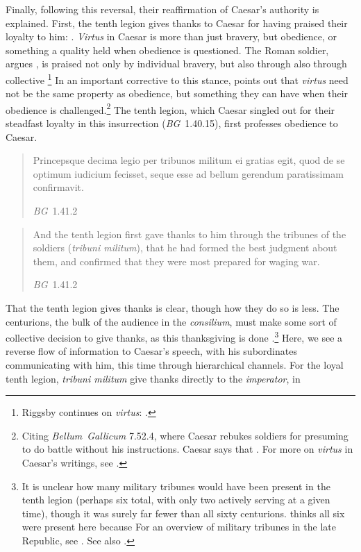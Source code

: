 \documentclass[12pt,letterpaper,oneside,final]{memoir}
\begin{document}
Finally, following this reversal, their reaffirmation of Caesar's authority is explained. First, the tenth legion gives thanks to Caesar for having praised their loyalty to him: . \emph{Virtus} in Caesar is more than just bravery, but obedience, or something a quality held when obedience is questioned. The Roman soldier, argues \textcite[89]{riggsby2006}, is praised not only by individual bravery, but also through also through collective \footnote{Riggsby continues on \emph{virtus}: .} In an important corrective to this stance, \textcite[303--304]{mcdonnell2006} points out that \emph{virtus} need not be the same property as obedience, but something they can have when their obedience is challenged.\footnote{Citing \emph{Bellum~Gallicum} 7.52.4, where Caesar rebukes soldiers for presuming to do battle without his instructions. Caesar says that . For more on \emph{virtus} in Caesar's writings, see \textcite[300--319]{mcdonnell2006}.} The tenth legion, which Caesar singled out for their steadfast loyalty in this insurrection (\emph{BG}~1.40.15), first professes obedience to Caesar. \blockquote[\emph{BG}~1.41.2]{\textlatin{Princepsque decima legio per tribunos militum ei gratias egit, quod de se optimum iudicium fecisset, seque esse ad bellum gerendum paratissimam confirmavit.}} \blockquote[\emph{BG}~1.41.2]{And the tenth legion first gave thanks to him through the tribunes of the soldiers (\emph{tribuni militum}), that he had formed the best judgment about them, and confirmed that they were most prepared for waging war.} That the tenth legion gives thanks is clear, though how they do so is less. The centurions, the bulk of the audience in the \emph{consilium}, must make some sort of collective decision to give thanks, as this thanksgiving is done .\footnote{It is unclear how many military tribunes would have been present in the tenth legion (perhaps six total, with only two actively serving at a given time), though it was surely far fewer than all sixty centurions. \textcite[57]{holmes1914a} thinks all six were present here because  \label{tribuni-militum} For an overview of military tribunes in the late Republic, see \textcite[41--42]{suolahti1955}. See also \textcite[136--141]{rosenstein2007}.} Here, we see a reverse flow of information to Caesar's speech, with his subordinates communicating with him, this time through hierarchical channels. For the loyal tenth legion, \emph{tribuni militum} give thanks directly to the \emph{imperator}, in 
\end{document}
